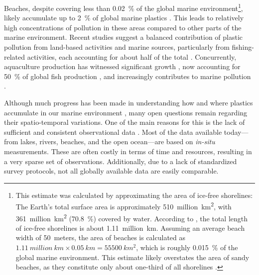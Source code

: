 Beaches, despite covering less than \qty{0.02}{\percent} of the global marine environment\footnote{This estimate was calculated by approximating the area of ice-free shorelines: The Earth's total surface area is approximately \qty{510}{million~km^2}, with \qty{361}{million~km^2} (\qty{70.8}{\percent}) covered by water. According to \citet{luijendijk_state_2018}, the total length of ice-free shorelines is about \qty{1.11}{million~km}. Assuming an average beach width of \qty{50}{meters}, the area of beaches is calculated as $\qty{1.11}{million~km} \times \qty{0.05}{km} = \qty{55500}{km^2}$, which is roughly \qty{0.015}{\percent} of the global marine environment. This estimate likely overstates the area of sandy beaches, as they constitute only about one-third of all shorelines \cite{luijendijk_state_2018}.}, likely accumulate up to \qty{2}{\percent} of global marine plastics \cite{kaandorp_global_2023}. This leads to relatively high concentrations of pollution in these areas compared to other parts of the marine environment. Recent studies suggest a balanced contribution of plastic pollution from land-based activities and marine sources, particularly from fishing-related activities, each accounting for about half of the total \cite{li_plastic_2016,kaandorp_global_2023}. Concurrently, aquaculture production has witnessed significant growth \cite{paolo_satellite_2024,fao_state_2022}, now accounting for \qty{50}{\percent} of global fish production \cite{fao_state_2022}, and increasingly contributes to marine pollution \cite{bringer_coastal_2021,lin_environmental_2023,kruger_plastic_2020,hinojosa_floating_2009}.

Although much progress has been made in understanding how and where plastics accumulate in our marine environment \cite[e.g.][]{strokal_river_2023,mai_country-specific_2023,morales-caselles_inshoreoffshore_2021,chassignet_tracking_2021}, many open questions remain regarding their spatio-temporal variations. One of the main reasons for this is the lack of sufficient and consistent observational data \cite{haarr_global_2022}. Most of the data available today---from lakes, rivers, beaches, and the open ocean---are based on \textit{in-situ} measurements. These are often costly in terms of time and resources, resulting in a very sparse set of observations. Additionally, due to a lack of standardized survey protocols, not all globally available data are easily comparable.

